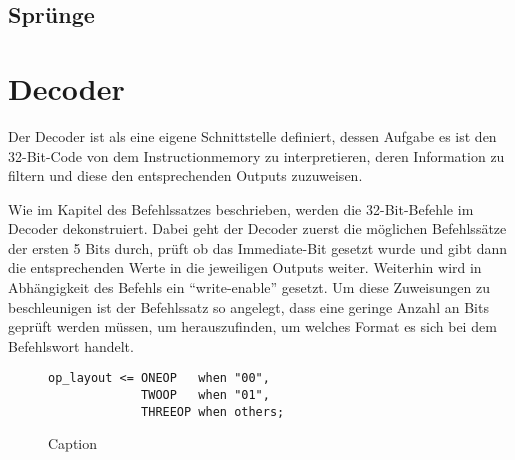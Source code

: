 \documentclass[paper=a4,fontsize=12pt,twocolumn]{scrreprt}
\begin{document}

\subsection{Sprünge}


\section{Decoder}


Der Decoder ist als eine eigene Schnittstelle definiert, dessen Aufgabe es ist den 32-Bit-Code von dem Instructionmemory zu interpretieren, deren Information zu filtern und diese den entsprechenden Outputs zuzuweisen.

Wie im Kapitel des Befehlssatzes beschrieben, werden die 32-Bit-Befehle im Decoder dekonstruiert.
Dabei geht der Decoder zuerst die möglichen Befehlssätze der ersten 5 Bits durch, prüft ob das Immediate-Bit gesetzt wurde und gibt dann die entsprechenden Werte in die jeweiligen Outputs weiter.
Weiterhin wird in Abhängigkeit des Befehls ein \enquote{write-enable} gesetzt.
Um diese Zuweisungen zu beschleunigen ist der Befehlssatz so angelegt, dass eine geringe Anzahl an Bits geprüft werden müssen, um herauszufinden, um welches Format es sich bei dem Befehlswort handelt.

\begin{figure}
    \centering
    \begin{lstlisting}
op_layout <= ONEOP   when "00",
             TWOOP   when "01",
             THREEOP when others;
    \end{lstlisting}
    \caption{Caption}
    \label{fig:my_label}
\end{figure}
\end{document}
